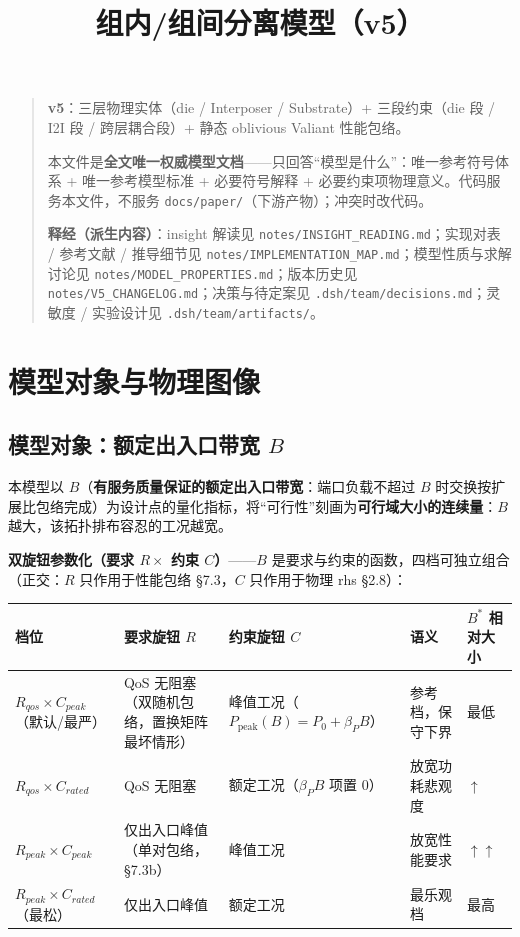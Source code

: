 \documentclass[11pt]{article}
\title{组内/组间分离模型（v5）}
\author{}
\date{}
\begin{document}
\maketitle

\begin{quote}
\textbf{v5}：三层物理实体（die / Interposer / Substrate）+ 三段约束（die 段 / I2I 段 / 跨层耦合段）+ 静态 oblivious Valiant 性能包络。

本文件是\textbf{全文唯一权威模型文档}——只回答“模型是什么”：唯一参考符号体系 + 唯一参考模型标准 + 必要符号解释 + 必要约束项物理意义。代码服务本文件，不服务 \texttt{docs/paper/}（下游产物）；冲突时改代码。

\textbf{释经（派生内容）}：insight 解读见 \texttt{notes/INSIGHT\_READING.md}；实现对表 / 参考文献 / 推导细节见 \texttt{notes/IMPLEMENTATION\_MAP.md}；模型性质与求解讨论见 \texttt{notes/MODEL\_PROPERTIES.md}；版本历史见 \texttt{notes/V5\_CHANGELOG.md}；决策与待定案见 \texttt{.dsh/team/decisions.md}；灵敏度 / 实验设计见 \texttt{.dsh/team/artifacts/}。
\end{quote}

\section{模型对象与物理图像}

\subsection{模型对象：额定出入口带宽 $B$}

本模型以 $B$（\textbf{有服务质量保证的额定出入口带宽}：端口负载不超过 $B$ 时交换按扩展比包络完成）为设计点的量化指标，将“可行性”刻画为\textbf{可行域大小的连续量}：$B$ 越大，该拓扑排布容忍的工况越宽。

\textbf{双旋钮参数化（要求 $R \times$ 约束 $C$）}——$B$ 是要求与约束的函数，四档可独立组合（正交：$R$ 只作用于性能包络 §7.3，$C$ 只作用于物理 rhs §2.8）：

\begin{center}
\begin{tabularx}{\textwidth}{@{}lX X X X@{}}
\toprule
档位 & 要求旋钮 $R$ & 约束旋钮 $C$ & 语义 & $B^*$ 相对大小 \\
\midrule
$R_{qos} \times C_{peak}$（默认/最严） & QoS 无阻塞（双随机包络，置换矩阵最坏情形） & 峰值工况（$P_{\text{peak}}(B)=P_0+\beta_P B$） & 参考档，保守下界 & 最低 \\
$R_{qos} \times C_{rated}$ & QoS 无阻塞 & 额定工况（$\beta_P B$ 项置 0） & 放宽功耗悲观度 & $\uparrow$ \\
$R_{peak} \times C_{peak}$ & 仅出入口峰值（单对包络，§7.3b） & 峰值工况 & 放宽性能要求 & $\uparrow\uparrow$ \\
$R_{peak} \times C_{rated}$（最松） & 仅出入口峰值 & 额定工况 & 最乐观档 & 最高 \\
\bottomrule
\end{tabularx}
\end{center}
\end{document}
